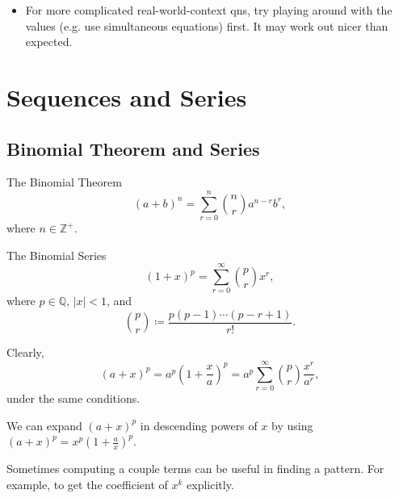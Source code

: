 \documentclass[oneside]{book}
\begin{document}
\begin{IN}
\begin{itemize}
    Order is \emph{Preserved} under exponentiation/logarithms if the base is \emph{larger than} one. Otherwise, when it is \emph{less than} one, the order is \emph{reversed}. \url{https://www.desmos.com/calculator/gd8z5fa0bg}
    \item  For more complicated real-world-context qns, try playing around with the values (e.g. use simultaneous equations) first. It may work out nicer than expected.
\end{itemize}
\end{IN}

\chapter{Sequences and Series}
\section{Binomial Theorem and Series}
\begin{theorem}{The Binomial Theorem}{}
  \[(a+b)^n=\sum_{r=0}^{n}{\binom{n}{r}a^{n-r}b^r},\]
  where \(n \in \mathbb{Z}^{+}\).
\end{theorem}
\begin{theorem}{The Binomial Series}{}
  \[(1+x)^{p}=\sum_{r=0}^{\infty}{\binom{p}{r}x^r},\]
  where \(p \in \mathbb{Q}\), \(\lvert x \rvert<1\), and
  \[\binom{p}{r}\coloneq \frac{p(p-1)\cdots(p-r+1)}{r!}.\]
\end{theorem}
\begin{corollary}{}{}
  Clearly,
  \[(a+x)^p=a^p\left(1+\frac{x}{a}\right)^p=a^p \sum_{r=0}^{\infty}{\binom{p}{r}\frac{x^r}{a^r}},\]
  under the same conditions.
\end{corollary}
\begin{fact}
  We can expand \((a+x)^p\) in descending powers of \(x\) by using \((a+x)^p=x^p\left(1+\frac{a}{x}\right)^p\).
\end{fact}
\begin{note}
  Sometimes computing a couple terms can be useful in finding a pattern. For example, to get the coefficient of \(x^k\) explicitly.
\end{note}
\newpage
\end{document}
